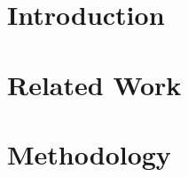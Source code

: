 

\maketitle
\begin{abstract}
	
\end{abstract}
\section{Introduction}

\section{Related Work}

\section{Methodology}

\IEEEpeerreviewmaketitle




